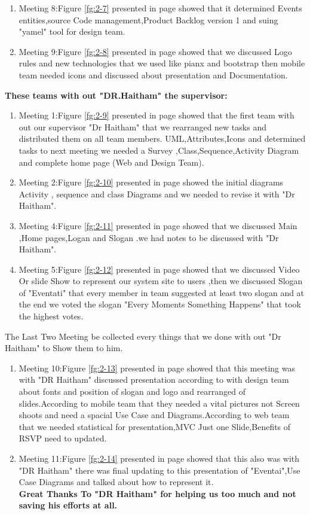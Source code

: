 \documentclass[12pt,a4paper,class,twoside,openany]{report}
\begin{document}
\begin{enumerate}
\item Meeting 8:Figure \ref{fg:2-7} presented in page \pageref{fg:2-7} showed that it
determined Events entities,source Code management,Product Backlog version 1  and  suing "yamel" tool for design team.
\item Meeting 9:Figure \ref{fg:2-8} presented in page \pageref{fg:2-8} showed that we discussed Logo rules and new technologies that we used like pianx and bootstrap then  mobile team needed icons and discussed about presentation and Documentation.
\end{enumerate}
\textbf{These teams with out "DR.Haitham" the supervisor:}
\begin{enumerate}
\item Meeting 1:Figure \ref{fg:2-9} presented in page \pageref{fg:2-9} showed that the first team with out our supervisor "Dr Haitham" that we rearranged new tasks and distributed them on all team members. UML,Attributes,Icons and determined tasks to next meeting we needed a Survey  ,Class,Sequence,Activity Diagram and complete home page (Web and Design Team).
\item Meeting 2:Figure \ref{fg:2-10} presented in page \pageref{fg:2-10} showed the initial diagrams Activity , sequence and class Diagrams and we needed to revise it with "Dr Haitham".
\item Meeting 4:Figure \ref{fg:2-11} presented in page \pageref{fg:2-11} showed that we discussed Main ,Home pages,Logan and Slogan .we had notes to be discussed with "Dr Haitham".
\item Meeting 5:Figure \ref{fg:2-12} presented in page \pageref{fg:2-12} showed that we 
discussed Video Or slide Show to represent our system site to users ,then we discussed Slogan of "Eventati" that every member in team  suggested at least two slogan and at the end we voted the slogan "Every Moments Something Happens" that took the highest votes.
\end{enumerate}
The Last Two Meeting be collected every things that we done with out "Dr Haitham" to Show them to him.
\begin{enumerate}
\item Meeting 10:Figure \ref{fg:2-13} presented in page \pageref{fg:2-13} showed that this meeting was with "DR Haitham" discussed  presentation according to with design team about fonts and position of slogan and logo and rearranged of slides.According to mobile team that they needed a vital pictures not Screen shoots and need a spacial Use Case and Diagrams.According to web team that we needed statistical for presentation,MVC Just one Slide,Benefits of RSVP need to updated.
\item Meeting 11:Figure \ref{fg:2-14} presented in page \pageref{fg:2-14} showed that this also was with "DR Haitham" there was final updating to this presentation of "Eventai",Use Case Diagrams  and talked about how to represent it.
\\ \textbf{Great Thanks To "DR Haitham" for helping us too much and not saving his efforts at all.}
\end{enumerate}
\end{document}
